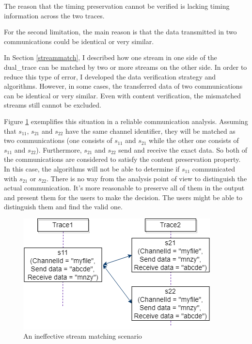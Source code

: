 The reason that the timing preservation cannot be verified is lacking timing information across the two traces. 

For the second limitation, the main reason is that the data transmitted in two communications could be identical or very similar. 

In Section \ref{streammatch}, I described how one stream in one side of the dual\_trace can be matched by two or more streams on the other side. In order to reduce this type of error, I developed the data verification strategy and algorithms. However, in some cases, the transferred data of two communications can be identical or very similar. Even with content verification, the mismatched streams still cannot be excluded.

Figure \ref{secondlevelmatching} exemplifies this situation in a reliable communication analysis. Assuming that $s_{11}$, $s_{21}$ and $s_{22}$ have the same channel identifier, they will be matched as two communications (one consists of $s_{11}$ and $s_{21}$ while the other one consists of $s_{11}$ and $s_{22}$). Furthermore, $s_{21}$ and $s_{22}$ send and receive the exact data. So both of the communications are considered to satisfy the content preservation property. In this case, the algorithms will not be able to determine if  $s_{11}$ communicated with $s_{21}$ or $s_{22}$. There is no way from the analysis point of view to distinguish the actual communication. It's more reasonable to preserve all of them in the output and present them for the users to make the decision. The users might be able to distinguish them and find the valid one.


\begin{figure}[H]
\centerline{\includegraphics{Figures/secondlevelmatching}}
 \caption{An ineffective stream matching scenario}
\label{secondlevelmatching}
\end{figure}



